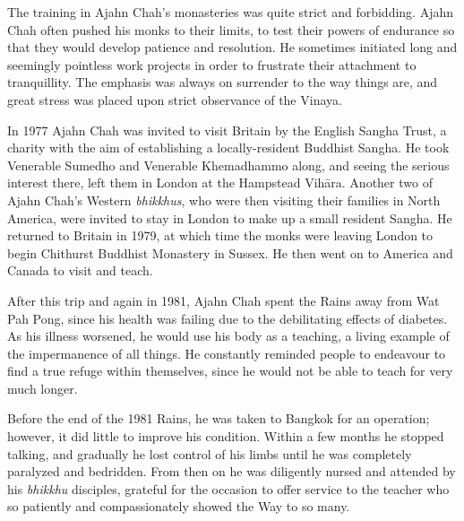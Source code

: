 The training in Ajahn Chah's monasteries was quite strict and
forbidding. Ajahn Chah often pushed his monks to their limits, to test
their powers of endurance so that they would develop patience and
resolution. He sometimes initiated long and seemingly pointless work
projects in order to frustrate their attachment to tranquillity. The
emphasis was always on surrender to the way things are, and great stress
was placed upon strict observance of the Vinaya. 

In 1977 Ajahn Chah was invited to visit Britain by the English Sangha
Trust, a charity with the aim of establishing a locally-resident
Buddhist Sangha. He took Venerable Sumedho and Venerable Khemadhammo
along, and seeing the serious interest there, left them in London at the
Hampstead Vihāra. Another two of Ajahn Chah's Western \emph{bhikkhus}, 
who were then visiting their families in North America, were invited to
stay in London to make up a small resident Sangha. He returned to
Britain in 1979, at which time the monks were leaving London to begin
Chithurst Buddhist Monastery in Sussex. He then went on to America and
Canada to visit and teach. 

After this trip and again in 1981, Ajahn Chah spent the Rains away from
Wat Pah Pong, since his health was failing due to the debilitating
effects of diabetes. As his illness worsened, he would use his body as a
teaching, a living example of the impermanence of all things. He
constantly reminded people to endeavour to find a true refuge within
themselves, since he would not be able to teach for very much longer. 

Before the end of the 1981 Rains, he was taken to Bangkok for an
operation; however, it did little to improve his condition. Within a few
months he stopped talking, and gradually he lost control of his limbs
until he was completely paralyzed and bedridden. From then on he was
diligently nursed and attended by his \emph{bhikkhu} disciples, grateful
for the occasion to offer service to the teacher who so patiently and
compassionately showed the Way to so many. 

